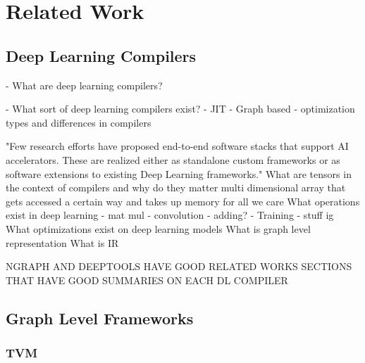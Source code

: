 
\chapter{Related Work} %

\label{Chapter2} %

\section{Deep Learning Compilers}

- What are deep learning compilers?

- What sort of deep learning compilers exist?
	- JIT
	- Graph based
	- optimization types and differences in compilers

"Few research efforts have proposed end-to-end software stacks that support AI accelerators. 
These are realized either as standalone custom frameworks or as software extensions to existing Deep Learning
frameworks." \cite{onsram}
What are tensors in the context of compilers and why do they matter
	multi dimensional array that gets accessed a certain way and takes up memory for all we care
What operations exist in deep learning
- mat mul
- convolution
- adding?
- Training
- stuff ig
What optimizations exist on deep learning models
What is graph level representation
What is IR 

NGRAPH AND DEEPTOOLS HAVE GOOD RELATED WORKS SECTIONS THAT HAVE GOOD SUMMARIES ON EACH DL COMPILER




\section{Graph Level Frameworks}


\subsection{TVM}

